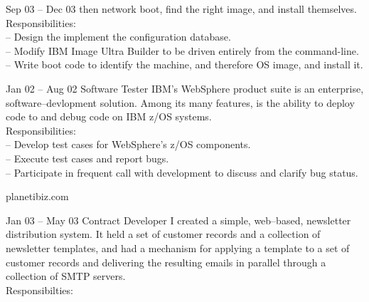 \documentclass[letterpaper, 11pt]{article}
\begin{document}
\begin{resume}
\begin{block}
\begin{subcategory}{Sep 03 -- Dec 03}
                then network boot, find the right image, and install themselves.
                \\[1ex]
                Responsibilities: \\
                -- Design the implement the configuration database. \\
                -- Modify IBM Image Ultra Builder to be driven entirely from the command-line. \\
                -- Write boot code to identify the machine, and therefore OS image, and install it.
                \bigskip
            \end{subcategory}
            \begin{subcategory}{Jan 02 -- Aug 02}
                 {Software Tester}
                IBM's WebSphere product suite is an enterprise, software--devlopment solution.  Among
                its many features, is the ability to deploy code to and debug code on IBM z/OS systems.
                \\[1ex]
                Responsibilities: \\
                -- Develop test cases for WebSphere's z/OS components. \\
                -- Execute test cases and report bugs. \\
                -- Participate in frequent call with development to discuss and clarify bug status.
                \bigskip
                \bigskip
            \end{subcategory}
        \end{block}
        \begin{block}
            \begin{category}{planetibiz.com}
                  {}
                \smallskip
            \end{category}
            \begin{subcategory}{Jan 03 -- May 03}
                 {Contract Developer}
                I created a simple, web--based, newsletter distribution system.
                It held a set of customer records and a collection of newsletter templates,
                and had a mechanism for applying a template to a set of customer records and
                delivering the resulting emails in parallel through a collection of SMTP servers.
                \\[1ex]
                Responsibilties: \\

\end{subcategory}
\end{block}
\end{resume}
\end{document}
